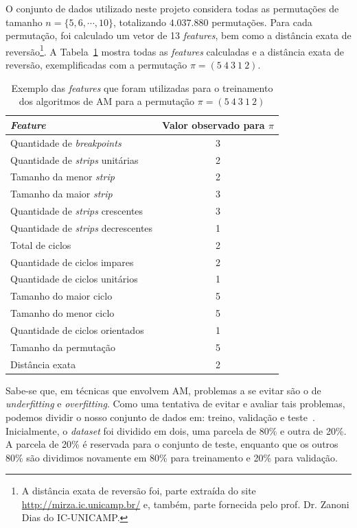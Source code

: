 \documentclass[runningheads,a4paper]{llncs}
\begin{document}
O conjunto de dados utilizado neste projeto considera todas as permutações de tamanho $n = \{5,6,\cdots,10\}$, totalizando $4.037.880$ permutações. Para cada permutação, foi calculado um vetor de 13 \textit{features}, bem como a distância exata de reversão\footnote{A distância exata de reversão foi, parte extraída do site \url{http://mirza.ic.unicamp.br/} e, também, parte fornecida pelo prof. Dr. Zanoni Dias do IC-UNICAMP.}. A Tabela~\ref{tab:1} mostra todas as \textit{features} calculadas e a distância exata de reversão, exemplificadas com a permutação $\pi = (5\ 4\ 3\ 1\ 2)$.

\begin{table}[ht]
	\centering
	\caption{Exemplo das \textit{features} que foram utilizadas para o treinamento dos algoritmos de AM para a permutação $\pi = (5\ 4\ 3\ 1\ 2)$}
	\label{tab:1}
	\begin{tabular}{lc}
		\toprule
		\textit{Feature} & Valor observado para $\pi$\\ 
		\midrule
		Quantidade de \textit{breakpoints} & 3 \\
    	Quantidade de \textit{strips} unitárias & 2 \\ 
    	Tamanho da menor \textit{strip} & 2 \\
    	Tamanho da maior \textit{strip} & 3 \\
    	Quantidade de \textit{strips} crescentes & 3 \\
    	Quantidade de \textit{strips} decrescentes & 1 \\
    	Total de ciclos & 2 \\
    	Quantidade de ciclos impares & 2 \\
    	Quantidade de ciclos unitários & 1 \\
    	Tamanho do maior ciclo & 5 \\
    	Tamanho do menor ciclo & 5 \\
    	Quantidade de ciclos orientados & 1 \\
    	Tamanho da permutação & 5 \\
    	\midrule
    	Distância exata & 2\\
		\bottomrule
	\end{tabular}
\end{table}

Sabe-se que, em técnicas que envolvem AM, problemas a se evitar são o de \textit{underfitting} e \textit{overfitting}. Como uma tentativa de evitar e avaliar tais problemas, podemos dividir o nosso conjunto de dados em: treino, validação e teste~\cite{Neter,Bishop}. Inicialmente, o \textit{dataset} foi dividido em dois, uma parcela de 80\% e outra de 20\%. A parcela de 20\% é reservada para o conjunto de teste, enquanto que os outros 80\% são dividimos novamente em 80\% para treinamento e 20\% para validação.
\end{document}
